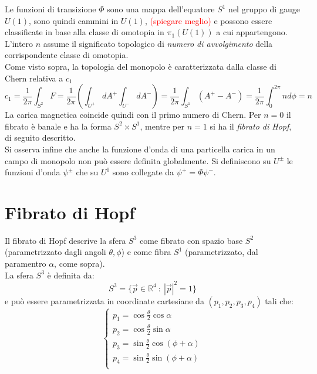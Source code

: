 Le funzioni di transizione $\Phi$ sono una mappa dell'equatore $S^1$ nel gruppo
di gauge $U(1)$, sono quindi cammini in $U(1)$,
\textcolor{red}{(spiegare meglio)}
e possono essere
classificate in base alla classe di omotopia in $\pi_1(U(1))$ a cui appartengono.
L'intero $n$ assume il significato topologico di \emph{numero di avvolgimento}
della corrispondente classe di omotopia.\\

Come visto sopra, la topologia del monopolo è caratterizzata dalla classe di Chern
relativa a $c_1$
\begin{equation*}
      c_1   = \frac{1}{2\pi} \int_{S^2} F
            = \frac{1}{2\pi} \left( \int_{U^+} dA^+ \int_{U^-} dA^- \right)
            = \frac{1}{2\pi} \int_{S^1} (A^+-A^-)
            = \frac{1}{2\pi} \int_0^{2\pi} nd\phi  = n
\end{equation*}
La carica magnetica coincide quindi con il primo numero di Chern. Per $n=0$ il
fibrato è banale e ha la forma $S^2 \times S^1$, mentre per $n=1$ si ha il
\emph{fibrato di Hopf}, di seguito descritto.\\

Si osserva infine che anche la funzione d'onda di una particella carica in un
campo di monopolo non può essere definita globalmente.
Si definiscono su $U^\pm$ le funzioni d'onda $\psi^\pm$ che su $U^0$ sono collegate
da $\psi^+ = \Phi \psi^-$.
\section{Fibrato di Hopf}
Il fibrato di Hopf descrive la sfera $S^3$ come fibrato con spazio
base $S^2$ (parametrizzato dagli angoli $\theta,\phi$) e come fibra $S^1$ (parametrizzato,
dal paramentro $\alpha$, come sopra).\\

La sfera $S^3$ è definita da:
$$ S^3 = \{ \vec p \in \mathbb{R}^4 \: : \: |\vec p|^2 = 1 \} $$
e può essere parametrizzata in coordinate cartesiane da $(p_1,p_2,p_3,p_4)$
tali che:
\begin{equation}
   \begin{cases}
      p_1 = \cos \frac{\theta}{2} \cos \alpha \\
      p_2 = \cos \frac{\theta}{2} \sin \alpha \\
      p_3 = \sin \frac{\theta}{2} \cos (\phi + \alpha) \\
      p_4 = \sin \frac{\theta}{2} \sin (\phi + \alpha) \\
   \end{cases}
\end{equation}

